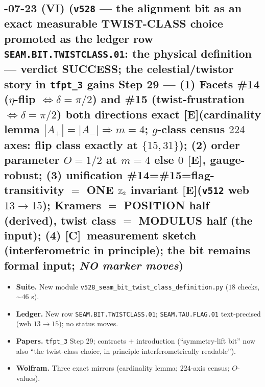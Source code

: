 \documentclass[11pt]{article}
\providecommand{\mE}{\textbf{[E]}}\providecommand{\mC}{\textbf{[C]}}
\providecommand{\vref}[1]{\texttt{#1}}
\begin{document}
\subsection*{-07-23 (VI) (\texttt{v528} --- the alignment bit as an exact measurable TWIST-CLASS choice promoted as the ledger row \texttt{SEAM.BIT.TWISTCLASS.01}: the physical definition --- verdict SUCCESS; the celestial/twistor story in \texttt{tfpt\_3} gains Step 29 --- (1) Facets \#14 ($\eta$-flip $\Leftrightarrow\delta=\pi/2$) and \#15 (twist-frustration $\Leftrightarrow\delta=\pi/2$) both directions exact \mE (cardinality lemma $|A_+|=|A_-|\Rightarrow m=4$; $g$-class census $224$ axes: flip class exactly at $\{15,31\}$); (2) order parameter $O=1/2$ at $m=4$ else $0$ \mE, gauge-robust; (3) unification \#14=\#15=flag-transitivity $=$ ONE $\mathbb{Z}_2$ invariant \mE (\vref{v512} web $13\to15$); Kramers $=$ POSITION half (derived), twist class $=$ MODULUS half (the input); (4) \mC\ measurement sketch (interferometric in principle); the bit remains formal input; \emph{NO marker moves})}
\begin{itemize}[leftmargin=1.5em]
\item \textbf{Suite.} New module \texttt{v528\_seam\_bit\_twist\_class\_definition.py} ($18$ checks, $\sim46$ s).
\item \textbf{Ledger.} New row \texttt{SEAM.BIT.TWISTCLASS.01}; \texttt{SEAM.TAU.FLAG.01} text-precised
(web $13\to15$); no status moves.
\item \textbf{Papers.} \texttt{tfpt\_3} Step 29; contracts $+$ introduction (``symmetry-lift bit'' now also
``the twist-class choice, in principle interferometrically readable'').
\item \textbf{Wolfram.} Three exact mirrors (cardinality lemma; $224$-axis census; $O$-values).
\end{itemize}
\end{document}
